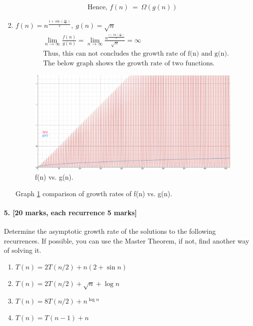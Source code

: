 \documentclass[a4paper]{scrartcl}
\begin{document}
\begin{enumerate}[label=(\alph*)]
\begin{align*}
    \text{Hence, }f(n)\ =\ \Omega(g(n))
  \end{align*}
  \item $f(n)=n^{\frac{1+\sin(\frac{\pi n}{2})}{2}},\ g(n)=\sqrt{n}$\\
  \begin{align*}
    &\ \lim_{n\to\infty} \frac{f(n)}{g(n)}=\lim_{n\to\infty} \frac{n^{\frac{1+\sin(\frac{\pi n}{2})}{2}}}{\sqrt{n}}=\infty\\ &\
    \text{Thus, this can not concludes the growth rate of f(n) and g(n).}\\ &\
    \text{The below graph shows the growth rate of two functions.}
  \end{align*}
  \begin{figure}[h!]
    \includegraphics[width=\linewidth]{f(n)-vs-g(n).png}
    \caption{f(n) vs. g(n).}
    \label{fig:f(n)-vs-g(n)}
  \end{figure}
  Graph \ref{fig:f(n)-vs-g(n)} comparison of growth rates of f(n) vs. g(n).
\end{enumerate}
\paragraph{5. [20 marks, each recurrence 5 marks]}
\label{sec:Question 5}
Determine the asymptotic growth rate of the solutions to the following recurrences. If possible, you can use the Master Theorem, if not, find another way of solving it.
\begin{enumerate}[label=(\alph*)]
  \item $T (n) = 2T (n/2) + n(2 + \sin{n})$
  \item $T (n) = 2T (n/2) + \sqrt{n} + \log{n}$
  \item $T (n) = 8T (n/2) + n^{\log{n}}$
  \item $T (n) = T (n − 1) + n$
\end{enumerate}
\end{document}
